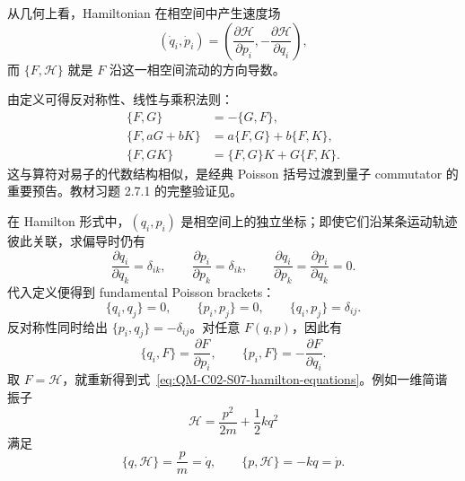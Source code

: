 从几何上看，Hamiltonian 在相空间中产生速度场
\[
  (\dot q_i,\dot p_i)
  =\left(
    \frac{\partial\mathcal H}{\partial p_i},
    -\frac{\partial\mathcal H}{\partial q_i}
  \right),
\]
而 $\{F,\mathcal H\}$ 就是 $F$ 沿这一相空间流动的方向导数。


由定义可得反对称性、线性与乘积法则：
\begin{align}
  \{F,G\}&=-\{G,F\},
  \label{eq:QM-C02-S07-antisymmetry}\\
  \{F,aG+bK\}
  &=a\{F,G\}+b\{F,K\},
  \label{eq:QM-C02-S07-linearity}\\
  \{F,GK\}
  &=\{F,G\}K+G\{F,K\}.
  \label{eq:QM-C02-S07-leibniz}
\end{align}
这与算符对易子的代数结构相似，是经典 Poisson 括号过渡到量子 commutator 的重要预告。教材习题 2.7.1 的完整验证见。

在 Hamilton 形式中，$(q_i,p_i)$ 是相空间上的独立坐标；即使它们沿某条运动轨迹彼此关联，求偏导时仍有
\[
  \frac{\partial q_i}{\partial q_k}=\delta_{ik},
  \qquad
  \frac{\partial p_i}{\partial p_k}=\delta_{ik},
  \qquad
  \frac{\partial q_i}{\partial p_k}
  =\frac{\partial p_i}{\partial q_k}=0.
\]
代入定义便得到 fundamental Poisson brackets：
\begin{equation}
  \boxed{
  \{q_i,q_j\}=0,
  \qquad
  \{p_i,p_j\}=0,
  \qquad
  \{q_i,p_j\}=\delta_{ij}.}
  \label{eq:QM-C02-S07-fundamental-brackets}
\end{equation}
反对称性同时给出 $\{p_i,q_j\}=-\delta_{ij}$。对任意 $F(q,p)$，因此有
\begin{equation}
  \boxed{
  \{q_i,F\}=\frac{\partial F}{\partial p_i},
  \qquad
  \{p_i,F\}=-\frac{\partial F}{\partial q_i}.}
  \label{eq:QM-C02-S07-coordinate-brackets}
\end{equation}
取 $F=\mathcal H$，就重新得到式~\eqref{eq:QM-C02-S07-hamilton-equations}。例如一维简谐振子
\[
  \mathcal H=\frac{p^2}{2m}+\frac12kq^2
\]
满足
\[
  \{q,\mathcal H\}=\frac pm=\dot q,
  \qquad
  \{p,\mathcal H\}=-kq=\dot p.
\]


